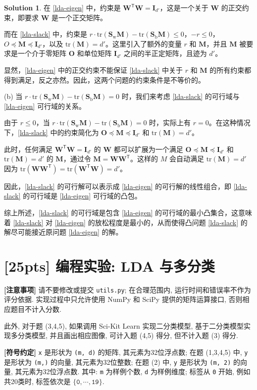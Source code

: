 \documentclass[a4paper]{article}
\numberwithin{equation}{section}
\theoremstyle{definition}
\newtheorem*{solution}{Solution}
\def \transposed {\mathsf{T}}
\def \Sw {\mathbf{S}_{\mathrm{w}}}
\def \Sb {\mathbf{S}_{\mathrm{b}}}
\def \O {\mathbf{O}}
\def \I {\mathbf{I}}
\def \M {\mathbf{M}}
\def \W {\mathbf{W}}
\newcommand\sbr[1]{\left( #1 \right)}
\newcommand\tr[1]{\mathrm{tr}\sbr{#1}}
\begin{document}
\begin{solution}
在 \eqref{lda-eigen} 中，约束是 $\W^\transposed \W = \I_{d'}$，这是一个关于 $\W$ 的正交约束，即要求 $\W$ 是一个正交矩阵。

而在 \eqref{lda-slack} 中，约束是 $r \cdot \tr{\Sw \M} - \tr{\Sb \M} \leqslant 0$，$-r \leqslant 0$，$O \preccurlyeq \M \preccurlyeq \I_{d'}$，以及 $\tr{\M} = d'$。这里引入了额外的变量 $r$ 和 $\M$，并且 $\M$ 被要求是一个介于零矩阵 $\O$ 和单位矩阵 $\I_{d'}$ 之间的半正定矩阵，且迹为 $d'$。

显然，\eqref{lda-eigen} 中的正交约束不能保证 \eqref{lda-slack} 中关于 $r$ 和 $\M$ 的所有约束都得到满足，反之亦然。因此，这两个问题的约束条件是不等价的。

(b) 当 $r \cdot \tr{\Sw \M} - \tr{\Sb \M} = 0$ 时，我们来考虑 \eqref{lda-slack} 的可行域与 \eqref{lda-eigen} 可行域的关系。

由于 $r \leqslant 0$，当 $r \cdot \tr{\Sw \M} - \tr{\Sb \M} = 0$ 时，实际上有 $r = 0$。在这种情况下，\eqref{lda-slack} 中的约束简化为 $\O \preccurlyeq \M \preccurlyeq \I_{d'}$ 和 $\tr{\M} = d'$。

此时，任何满足 $\W^\transposed \W = \I_{d'}$ 的 $\W$ 都可以扩展为一个满足 $\O \preccurlyeq \M \preccurlyeq \I_{d'}$ 和 $\tr{\M} = d'$ 的 $\M$，通过令 $\M = \W \W^\transposed$。这样的 $M$ 会自动满足 $\tr{\M} = d'$ 因为 $\tr{\W \W^\transposed} = \tr{\W^\transposed \W} = d'$。


因此，\eqref{lda-slack} 的可行解可以表示成 \eqref{lda-eigen} 的可行解的线性组合，即 \eqref{lda-slack} 的可行域是 \eqref{lda-eigen} 可行域的凸包。

综上所述，\eqref{lda-slack} 的可行域是包含 \eqref{lda-eigen} 的可行域的最小凸集合，这意味着 \eqref{lda-slack} 对 \eqref{lda-eigen} 的放松程度是最小的，从而使得凸问题 \eqref{lda-slack} 的解尽可能接近原问题 \eqref{lda-eigen} 的解。
\end{solution}

\newpage

\section{[25pts] 编程实验: LDA 与多分类}

\begin{tcolorbox}
	\textbf{[注意事项]} 请不要修改或提交 \texttt{utils.py}; 在合理范围内, 运行时间和错误率不作为评分依据. 实现过程中只允许使用 NumPy 和 SciPy 提供的矩阵运算接口, 否则相应题目不计入分数.

	此外, 对于题 (3,4,5), 如果调用 Sci-Kit Learn 实现二分类模型, 基于二分类模型实现多分类模型, 并且画出相应图像, 可计入题 (4,5) 得分, 但不计入题 (3) 得分.

	\textbf{[符号约定]} \texttt{x} 是形状为 \texttt{(m, d)} 的矩阵, 其元素为32位浮点数; 在题 (1,3,4,5) 中, \texttt{y} 是形状为 \texttt{(m,)} 的向量, 其元素为32位整数; 在题 (2) 中, \texttt{y} 是形状为 \texttt{(m, 2)} 的向量, 其元素为32位浮点数. 其中: \texttt{m} 为样例个数, \texttt{d} 为样例维度; 标签从 \texttt{0} 开始, 例如共20类时, 标签依次是 $\{\mathtt{0}, \cdots, \mathtt{19}\}$.
\end{tcolorbox}
\end{document}
